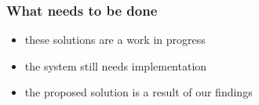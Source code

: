 \documentclass{beamer}
\begin{document}
\begin{frame}
\frametitle{What needs to be done}
\begin{itemize}
	\item these solutions are a work in progress
	\item the system still needs implementation
	\item the proposed solution is a result of our findings
\end{itemize}
\end{frame}
\end{document}
